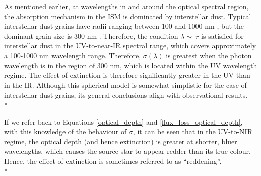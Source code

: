 \documentclass[12pt, a4paper]{report}
\begin{document}
As mentioned earlier, at wavelengths in and around the optical spectral region, the absorption mechanism in the ISM is dominated by interstellar dust. Typical interstellar dust grains have radii ranging between 100 and 1000 nm \citep{2000JGR...10510299W}, but the dominant grain size is 300 nm \citep{2003JGRA..108.8030L}. Therefore, the condition $\lambda \sim\ r$ is satisfied for interstellar dust in the UV-to-near-IR spectral range, which covers approximately a 100-1000 nm wavelength range. Therefore, $\sigma(\lambda)$ is greatest when the photon wavelength is in the region of 300 nm, which is located within the UV wavelength regime. The effect of extinction is therefore significantly greater in the UV than in the IR. Although this spherical model is somewhat simplistic for the case of interstellar dust grains, its general conclusions align with observational results.\\*

If we refer back to Equations \ref{optical_depth} and \ref{flux_loss_optical_depth}, with this knowledge of the behaviour of $\sigma$, it can be seen that in the UV-to-NIR regime, the optical depth (and hence extinction) is greater at shorter, bluer wavelengths,  which causes the source star to appear redder than its true colour. Hence, the effect of extinction is sometimes referred to as ``reddening''. \\*





\end{document}
